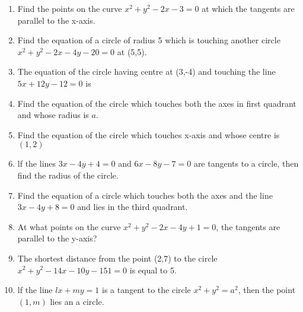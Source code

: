 \begin{enumerate}[label=\thesection.\arabic*,ref=\thesection.\theenumi]

\item Find the points on the curve $x^2+y^2-2x-3=0$ at which the tangents are parallel to the x-axis.
\label{chapters/12/6/3/19}
\\
\solution

\item Find the equation of a circle of radius 5 which is touching another circle $x^2+y^2-2x-4y-20=0$ at (5,5).
\item The equation of the circle having centre at (3,-4) and touching the line $5x+12y-12=0$ is \makebox[1cm]{\hrulefill}                     
 \item Find the equation of the circle which touches both the axes in first quadrant and whose radius is $a$.
 \item Find the equation of the circle which touches x-axis and whose centre is $(1,2)$
 \item lf the lines $3x-4y+4=0$ and $6x-8y-7=0$ are tangents to a circle, then find the radius of the circle.
 \item Find the equation of a circle which touches  both the axes and the line $3x-4y+8=0$ and lies in the third quadrant.
\item At what points on the curve $x^2+y^2-2x-4y+1=0$, the tangents are parallel to the y-axis?
\item The shortest distance from the point (2,7) to the circle $x^2+y^2- 14x-10y-151=0$ is equal to 5.
\item lf the line $lx+my=1$ is a tangent to the circle $x^2+y^2=a^2$, then the point $(1,m)$ lies an a circle.

\end{enumerate}
